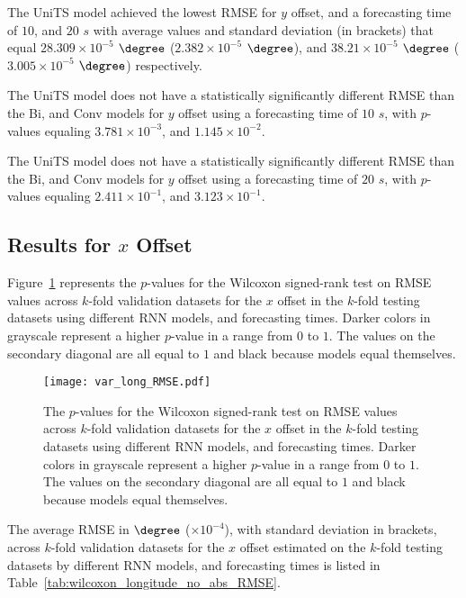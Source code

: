 The UniTS model achieved the lowest RMSE for $y$ offset, and a forecasting time of $10$, and $20$ $s$ with average values and standard deviation (in brackets) that equal $28.309 \times 10^{-5}$ $\degree$ ($2.382 \times 10^{-5}$ $\degree$), and $38.21 \times 10^{-5}$ $\degree$ ($3.005 \times 10^{-5}$ $\degree$) respectively.

The UniTS model does not have a statistically significantly different RMSE than the Bi, and Conv models for $y$ offset using a forecasting time of $10$ $s$, with $p$-values equaling $3.781 \times 10^{-3}$, and $1.145 \times 10^{-2}$.

The UniTS model does not have a statistically significantly different RMSE than the Bi, and Conv models for $y$ offset using a forecasting time of $20$ $s$, with $p$-values equaling $2.411 \times 10^{-1}$, and $3.123 \times 10^{-1}$.

\subsection{Results for $x$ Offset}

Figure~\ref{fig:var_long_RMSE} represents the $p$-values for the Wilcoxon signed-rank test on RMSE values across $k$-fold validation datasets for the $x$ offset in the $k$-fold testing datasets using different RNN models, and forecasting times. Darker colors in grayscale represent a higher $p$-value in a range from $0$ to $1$. The values on the secondary diagonal are all equal to $1$ and black because models equal themselves.

\begin{figure}[!ht]
	\centering
	\texttt{[image: var\_long\_RMSE.pdf]}
	\caption{The $p$-values for the Wilcoxon signed-rank test on RMSE values across $k$-fold validation datasets for the $x$ offset in the $k$-fold testing datasets using different RNN models, and forecasting times. Darker colors in grayscale represent a higher $p$-value in a range from $0$ to $1$. The values on the secondary diagonal are all equal to $1$ and black because models equal themselves.}
	\label{fig:var_long_RMSE}
\end{figure}

The average RMSE in $\degree$ ($\times 10^{-4}$), with standard deviation in brackets, across $k$-fold validation datasets for the $x$ offset estimated on the $k$-fold testing datasets by different RNN models, and forecasting times is listed in Table~\ref{tab:wilcoxon_longitude_no_abs_RMSE}.

